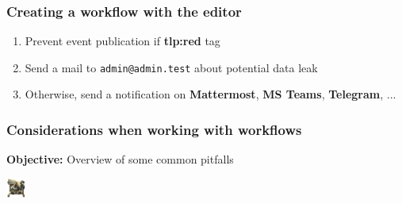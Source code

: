 \begin{frame}
    \frametitle{Creating a workflow with the editor}
    \begin{enumerate}
        \item Prevent event publication if \textbf{tlp:red} tag
        \item Send a mail to \texttt{admin@admin.test} about potential data leak
        \item Otherwise, send a notification on \textbf{Mattermost}, \textbf{MS Teams}, \textbf{Telegram}, ...
    \end{enumerate}
\end{frame}

\begin{frame}
    \frametitle{
        \huge
        \linebreak
        \linebreak
        \linebreak
        Considerations when working with workflows
        \vspace{1em}
    }
    \textbf{Objective:} Overview of some common pitfalls
    \begin{center}
        \includegraphics[width=24px]{pictures/radar.png}
    \end{center}
\end{frame}

